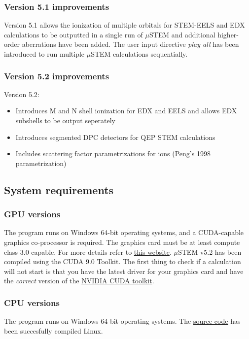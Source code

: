 \documentclass[12pt,a4paper]{article}
\begin{document}
\subsubsection{Version 5.1 improvements}

Version 5.1 allows the ionization of multiple orbitals for STEM-EELS and EDX calculations to be outputted in a single run of $\mu$STEM and additional higher-order aberrations have been added. The user input directive \emph{play all} has been introduced to run multiple $\mu$STEM calculations sequentially.

\subsubsection{Version 5.2 improvements}

Version 5.2: 
\begin{itemize}
	\item Introduces M and N shell ionization for EDX and EELS and allows EDX subshells to be output seperately
	\item Introduces segmented DPC detectors for QEP STEM calculations
	\item Includes scattering factor parametrizations for ions (Peng's 1998 parametrization) 
\end{itemize}


\subsection{System requirements}
\subsubsection{GPU versions}
The program runs on Windows 64-bit operating systems, and a CUDA-capable graphics co-processor is required. The graphics card must be at least compute class 3.0 capable.
For more details refer to \href{https://developer.nvidia.com/cuda-gpus}{this website}. $\mu$STEM v5.2 has been compiled using the CUDA 9.0 Toolkit. The first thing to check if a calculation will not start is that you have the latest driver for your graphics card and have the \emph{correct} version of the \href{https://developer.nvidia.com/cuda-toolkit-archive}{NVIDIA CUDA toolkit}.
\subsubsection{CPU versions}
The program runs on Windows 64-bit operating systems. The \href{https://github.com/HamishGBrown/MuSTEM}{source code} has been succesfully compiled Linux. 
\end{document}
